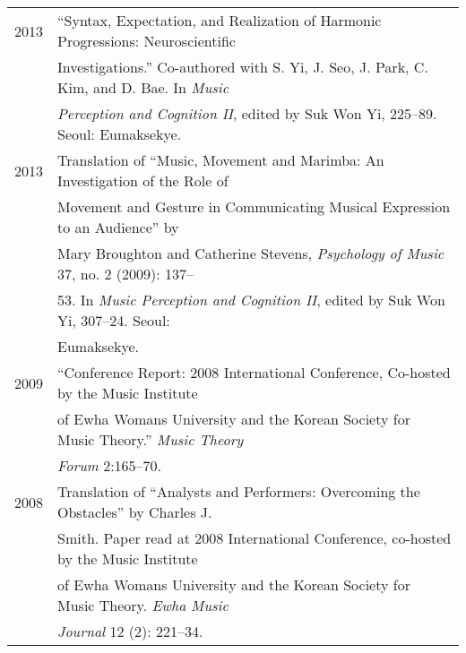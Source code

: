 \documentclass[letter,11pt,draft]{article}
\begin{document}
  \hspace*{-0.25cm}
  \begin{tabular}{p{2.5cm} p{12.5cm}}
%    
    2013 & “Syntax, Expectation, and Realization of Harmonic Progressions: Neuroscientific\\
    & Investigations.” Co-authored with S. Yi, J. Seo, J. Park, C. Kim, and D. Bae. In \textit{Music} \\
    & \textit{Perception and Cognition II}, edited by Suk Won Yi, 225–89. Seoul: Eumaksekye.\\[2mm]

    2013 & Translation of “Music, Movement and Marimba: An Investigation of the Role of\\
    & Movement and Gesture in Communicating Musical Expression to an Audience” by\\
    & Mary Broughton and Catherine Stevens, \textit{Psychology of Music} 37, no. 2 (2009): 137–\\
    & 53. In \textit{Music Perception and Cognition II}, edited by Suk Won Yi, 307–24. Seoul:\\
    & Eumaksekye.\\[2mm]
    
    2009 & “Conference Report: 2008 International Conference, Co-hosted by the Music Institute\\
    & of Ewha Womans University and the Korean Society for Music Theory.” \textit{Music Theory}\\
    & \textit{Forum} 2:165–70.\\[2mm]
    
    2008 & Translation of “Analysts and Performers: Overcoming the Obstacles” by Charles J.\\
    & Smith. Paper read at 2008 International Conference, co-hosted by the Music Institute\\
    & of Ewha Womans University and the Korean Society for Music Theory. \textit{Ewha Music}\\
    & \textit{Journal} 12 (2): 221–34.
  \end{tabular}
  
  \vspace{2.5mm}
  
\end{document}
